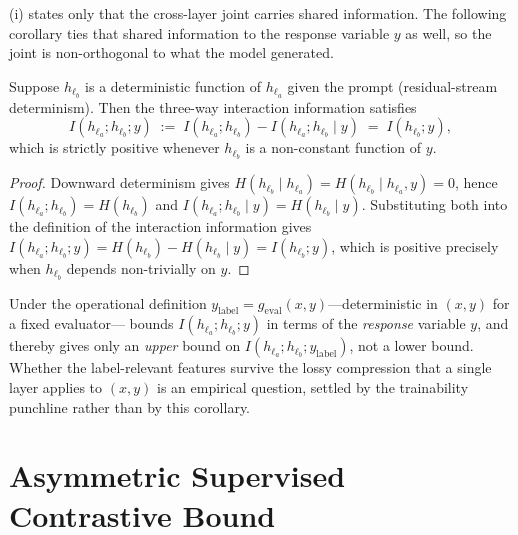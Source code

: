 (i) states only that the cross-layer joint carries shared
information. The following corollary ties that shared information to the response
variable $y$ as well, so the joint is non-orthogonal to what the model generated.

\begin{corollary}\label{cor:hd:coinfo}
Suppose $h_{\ell_b}$ is a deterministic function of $h_{\ell_a}$ given the prompt
(residual-stream determinism). Then the three-way interaction information
satisfies
\begin{equation} I(h_{\ell_a}; h_{\ell_b}; y) \;:=\; I(h_{\ell_a}; h_{\ell_b}) - I(h_{\ell_a}; h_{\ell_b} \mid y) \;=\; I(h_{\ell_b}; y), \label{eq:hd:coinfo} \end{equation}
which is strictly positive whenever $h_{\ell_b}$ is a non-constant function of
$y$.
\end{corollary}

\begin{proof}
Downward determinism gives
$H(h_{\ell_b}\mid h_{\ell_a}) = H(h_{\ell_b}\mid h_{\ell_a}, y) = 0$, hence
$I(h_{\ell_a}; h_{\ell_b}) = H(h_{\ell_b})$ and
$I(h_{\ell_a}; h_{\ell_b}\mid y) = H(h_{\ell_b}\mid y)$. Substituting both into
the definition of the interaction information gives
$I(h_{\ell_a}; h_{\ell_b}; y) = H(h_{\ell_b}) - H(h_{\ell_b}\mid y) = I(h_{\ell_b}; y)$,
which is positive precisely when $h_{\ell_b}$ depends non-trivially on $y$.
\end{proof}

\begin{remark}
Under the operational definition
$y_{\mathrm{label}} = g_{\mathrm{eval}}(x,y)$---deterministic in $(x,y)$ for a
fixed evaluator--- bounds $I(h_{\ell_a};h_{\ell_b};y)$ in
terms of the \emph{response} variable $y$, and thereby gives only an
\emph{upper} bound on $I(h_{\ell_a};h_{\ell_b};y_{\mathrm{label}})$, not a lower
bound. Whether the label-relevant features survive the lossy compression that a
single layer applies to $(x,y)$ is an empirical question, settled by the
trainability punchline rather than by this corollary.
\end{remark}

\section{Asymmetric Supervised Contrastive Bound}
\label{sec:hd-proofs:supcon}

